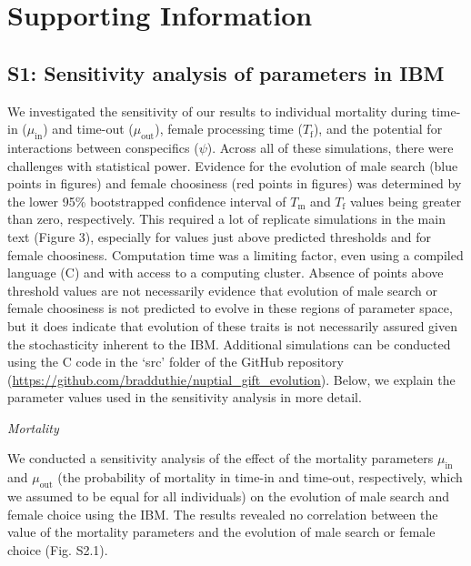 \documentclass[
]{article}
\begin{document}
\clearpage

\hypertarget{supporting-information}{%
\section{Supporting Information}\label{supporting-information}}

\hypertarget{s1-sensitivity-analysis-of-parameters-in-ibm}{%
\subsection{S1: Sensitivity analysis of parameters in
IBM}\label{s1-sensitivity-analysis-of-parameters-in-ibm}}

We investigated the sensitivity of our results to individual mortality
during time-in (\(\mu_{\mathrm{in}}\)) and time-out
(\(\mu_{\mathrm{out}}\)), female processing time (\(T_{\mathrm{f}}\)),
and the potential for interactions between conspecifics (\(\psi\)).
Across all of these simulations, there were challenges with statistical
power. Evidence for the evolution of male search (blue points in
figures) and female choosiness (red points in figures) was determined by
the lower 95\% bootstrapped confidence interval of \(T_{\mathrm{m}}\)
and \(T_{\mathrm{f}}\) values being greater than zero, respectively.
This required a lot of replicate simulations in the main text (Figure
3), especially for values just above predicted thresholds and for female
choosiness. Computation time was a limiting factor, even using a
compiled language (C) and with access to a computing cluster. Absence of
points above threshold values are not necessarily evidence that
evolution of male search or female choosiness is not predicted to evolve
in these regions of parameter space, but it does indicate that evolution
of these traits is not necessarily assured given the stochasticity
inherent to the IBM. Additional simulations can be conducted using the C
code in the `src' folder of the GitHub repository
(\url{https://github.com/bradduthie/nuptial_gift_evolution}). Below, we
explain the parameter values used in the sensitivity analysis in more
detail.

\emph{Mortality}

We conducted a sensitivity analysis of the effect of the mortality
parameters \(\mu_{\mathrm{in}}\) and \(\mu_{\mathrm{out}}\) (the
probability of mortality in time-in and time-out, respectively, which we
assumed to be equal for all individuals) on the evolution of male search
and female choice using the IBM. The results revealed no correlation
between the value of the mortality parameters and the evolution of male
search or female choice (Fig. S2.1).
\end{document}
